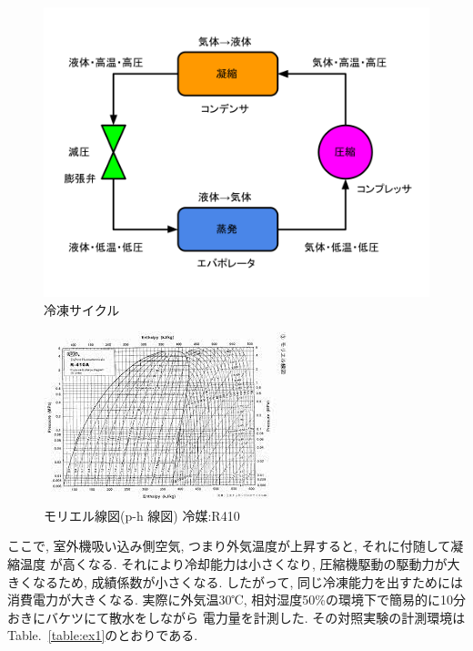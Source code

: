 \documentclass[a4j,fleqn,dvipdfmx,uplatex]{jsarticle}
\newcommand{\tableref}[1]{Table.\ \ref{#1}}
\begin{document}
\begin{figure}[tb]
  \centering
      \includegraphics[width=\linewidth]{img/cycle-2.png}
      \caption{冷凍サイクル}
      \label{fig1:cycle}
\end{figure}

\begin{figure}[tb]
    \centering
        \includegraphics[width=\linewidth]{img/ph線図.jpg}
        \caption{モリエル線図(p-h 線図) 冷媒:R410}
        \label{fig1:ph_r410}
\end{figure}

ここで, 室外機吸い込み側空気, つまり外気温度が上昇すると, それに付随して凝縮温度
が高くなる. それにより冷却能力は小さくなり, 圧縮機駆動の駆動力が大きくなるため, 
成績係数が小さくなる. したがって, 同じ冷凍能力を出すためには消費電力が大きくなる.  
実際に外気温30℃, 相対湿度50\%の環境下で簡易的に10分おきにバケツにて散水をしながら
電力量を計測した. その対照実験の計測環境は\tableref{table:ex1}のとおりである. 
\end{document}
